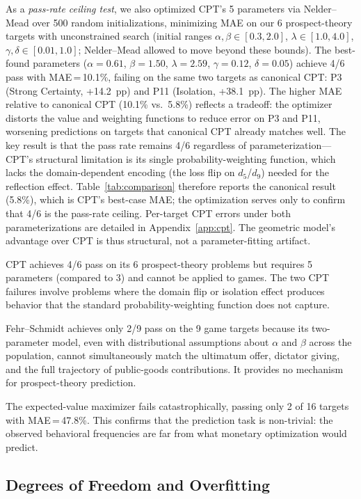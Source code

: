 \documentclass[journal]{IEEEtran}
\begin{document}
As a \emph{pass-rate ceiling test}, we also optimized CPT's 5 parameters via Nelder--Mead over 500 random initializations, minimizing MAE on our 6 prospect-theory targets with unconstrained search (initial ranges $\alpha, \beta \in [0.3, 2.0]$, $\lambda \in [1.0, 4.0]$, $\gamma, \delta \in [0.01, 1.0]$; Nelder--Mead allowed to move beyond these bounds).
The best-found parameters ($\alpha = 0.61$, $\beta = 1.50$, $\lambda = 2.59$, $\gamma = 0.12$, $\delta = 0.05$) achieve 4/6 pass with MAE\,=\,10.1\%, failing on the same two targets as canonical CPT: P3 (Strong Certainty, +14.2~pp) and P11 (Isolation, +38.1~pp).
The higher MAE relative to canonical CPT (10.1\% vs.\ 5.8\%) reflects a tradeoff: the optimizer distorts the value and weighting functions to reduce error on P3 and P11, worsening predictions on targets that canonical CPT already matches well.
The key result is that the pass rate remains 4/6 regardless of parameterization---CPT's structural limitation is its single probability-weighting function, which lacks the domain-dependent encoding (the loss flip on $d_5$/$d_9$) needed for the reflection effect.
Table~\ref{tab:comparison} therefore reports the canonical result (5.8\%), which is CPT's best-case MAE; the optimization serves only to confirm that 4/6 is the pass-rate ceiling.
Per-target CPT errors under both parameterizations are detailed in Appendix~\ref{app:cpt}.
The geometric model's advantage over CPT is thus structural, not a parameter-fitting artifact.

CPT achieves 4/6 pass on its 6 prospect-theory problems but requires 5 parameters (compared to 3) and cannot be applied to games.
The two CPT failures involve problems where the domain flip or isolation effect produces behavior that the standard probability-weighting function does not capture.

Fehr--Schmidt achieves only 2/9 pass on the 9 game targets because its two-parameter model, even with distributional assumptions about $\alpha$ and $\beta$ across the population, cannot simultaneously match the ultimatum offer, dictator giving, and the full trajectory of public-goods contributions.
It provides no mechanism for prospect-theory prediction.

The expected-value maximizer fails catastrophically, passing only 2 of 16 targets with MAE\,=\,47.8\%.
This confirms that the prediction task is non-trivial: the observed behavioral frequencies are far from what monetary optimization would predict.

\subsection{Degrees of Freedom and Overfitting}
\end{document}
